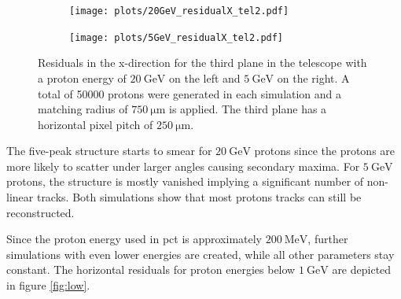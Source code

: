 \begin{figure}
  \hspace{-0.4cm}
  \begin{subfigure}{0.51\textwidth}
      \centering
      \texttt{[image: plots/20GeV\_residualX\_tel2.pdf]}
  \end{subfigure}
  \begin{subfigure}{0.51\textwidth}
      \hspace{-0.13cm}
      \texttt{[image: plots/5GeV\_residualX\_tel2.pdf]}
  \end{subfigure}
  \caption{Residuals in the x-direction for the third plane in the telescope with a proton energy of $\SI{20}{\giga\eV}$ on the left
  and $\SI{5}{\GeV}$ on the right. A total of 50000 protons were generated in each simulation and a matching radius of $\SI{750}{\micro\meter}$ is applied. The third plane has
  a horizontal pixel pitch of $\SI{250}{\micro\meter}$.}
  \label{fig:20GeV}
\end{figure}

The five-peak structure starts to smear for $\SI{20}{\giga\eV}$ protons since the protons are more likely to scatter under larger angles causing secondary maxima.
For $\SI{5}{\GeV}$ protons, the structure is mostly vanished implying a significant number of non-linear tracks. Both simulations show that most
protons tracks can still be reconstructed.

Since the proton energy used in pct is approximately $\SI{200}{\mega\eV}$, further simulations with even lower energies are created, while all other parameters stay constant.
The horizontal residuals for proton energies below $\SI{1}{\giga\eV}$ are depicted in figure \ref{fig:low}.

